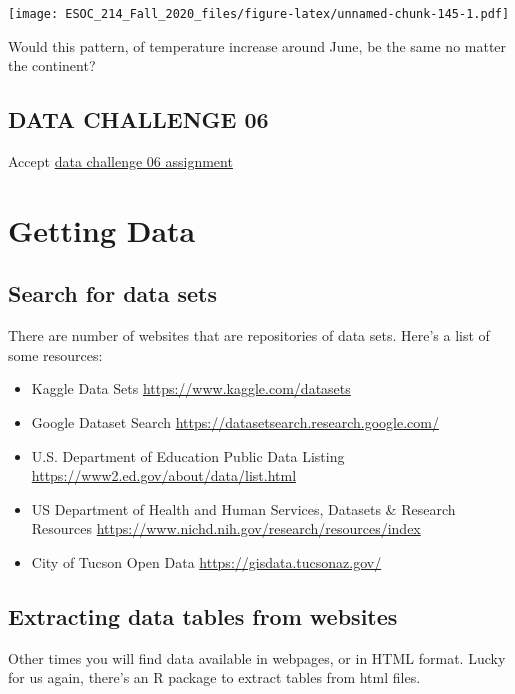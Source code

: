 \documentclass[
]{book}
\begin{document}
\texttt{[image: ESOC\_214\_Fall\_2020\_files/figure-latex/unnamed-chunk-145-1.pdf]}

Would this pattern, of temperature increase around June, be the same no matter the continent?

\hypertarget{data-challenge-06}{%
\section{DATA CHALLENGE 06}\label{data-challenge-06}}

Accept \href{https://classroom.github.com/a/MuuK7xMS}{data challenge 06 assignment}

\hypertarget{getting-data}{%
\chapter{Getting Data}\label{getting-data}}

\hypertarget{search-for-data-sets}{%
\section{Search for data sets}\label{search-for-data-sets}}

There are number of websites that are repositories of data sets. Here's a list of some resources:

\begin{itemize}
\item
  Kaggle Data Sets \url{https://www.kaggle.com/datasets}
\item
  Google Dataset Search \url{https://datasetsearch.research.google.com/}
\item
  U.S. Department of Education Public Data Listing \url{https://www2.ed.gov/about/data/list.html}
\item
  US Department of Health and Human Services, Datasets \& Research Resources \url{https://www.nichd.nih.gov/research/resources/index}
\item
  City of Tucson Open Data \url{https://gisdata.tucsonaz.gov/}
\end{itemize}

\hypertarget{extracting-data-tables-from-websites}{%
\section{Extracting data tables from websites}\label{extracting-data-tables-from-websites}}

Other times you will find data available in webpages, or in HTML format. Lucky for us again, there's an R package to extract tables from html files.
\end{document}
